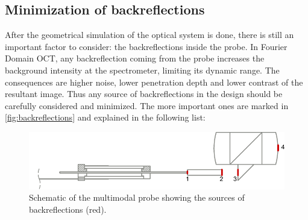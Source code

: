 \subsection{Minimization of backreflections}
After the geometrical simulation of the optical system is done, there is still an important factor to consider: the backreflections inside the probe. In Fourier Domain OCT, any backreflection coming from the probe increases the background intensity at the spectrometer, limiting its dynamic range. The consequences are higher noise, lower penetration depth and lower contrast of the resultant image. Thus any source of backreflections in the design should be carefully considered and minimized. The more important ones are marked in \autoref{fig:backreflections} and explained in the following list:

\begin{figure}[h!]\centering
      \includegraphics{figures/30_DesignSimulation/Optical/Backreflections/backreflections.pdf}
      \caption{Schematic of the multimodal probe showing the sources of backreflections (red).}
      \label{fig:backreflections}
\end{figure}

